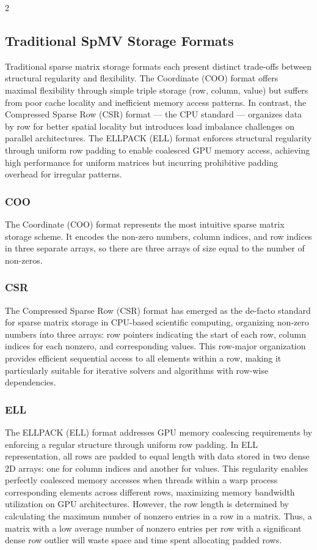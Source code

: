 \documentclass{article}
\begin{document}
\begin{multicols}{2}
\subsection{Traditional SpMV Storage Formats}
Traditional sparse matrix storage formats each present distinct trade-offs between structural regularity and flexibility. The Coordinate (COO) format offers maximal flexibility through simple triple storage (row, column, value) but suffers from poor cache locality and inefficient memory access patterns. In contrast, the Compressed Sparse Row (CSR) format — the CPU standard — organizes data by row for better spatial locality but introduces load imbalance challenges on parallel architectures. The ELLPACK (ELL) format enforces structural regularity through uniform row padding to enable coalesced GPU memory access, achieving high performance for uniform matrices but incurring prohibitive padding overhead for irregular patterns.
\subsubsection{COO}
The Coordinate (COO) format represents the most intuitive sparse matrix storage scheme. It encodes the non-zero numbers, column indices, and row indices in three separate arrays, so there are three arrays of size equal to the number of non-zeros.
\subsubsection{CSR}
The Compressed Sparse Row (CSR) format has emerged as the de-facto standard for sparse matrix storage in CPU-based scientific computing, organizing non-zero numbers into three arrays: row pointers indicating the start of each row, column indices for each nonzero, and corresponding values. This row-major organization provides efficient sequential access to all elements within a row, making it particularly suitable for iterative solvers and algorithms with row-wise dependencies. 
\subsubsection{ELL}
The ELLPACK (ELL) format addresses GPU memory coalescing requirements by enforcing a regular structure through uniform row padding. In ELL representation, all rows are padded to equal length with data stored in two dense 2D arrays: one for column indices and another for values. This regularity enables perfectly coalesced memory accesses when threads within a warp process corresponding elements across different rows, maximizing memory bandwidth utilization on GPU architectures. However, the row length is determined by calculating the maximum number of nonzero entries in a row in a matrix. Thus, a matrix with a low average number of nonzero entries per row with a significant dense row outlier will waste space and time spent allocating padded rows. 


\end{multicols}
\end{document}
